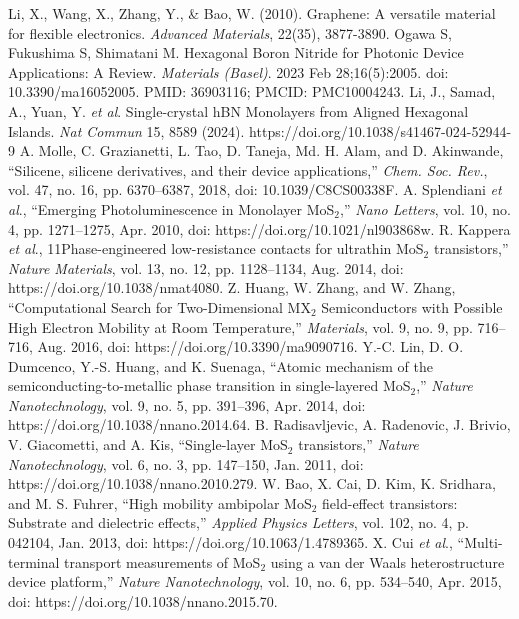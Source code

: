 \documentclass[conference]{IEEEtran}
\begin{document}
\begin{thebibliography}{00}
   Li, X., Wang, X., Zhang, Y., \& Bao, W. (2010). Graphene: A versatile material for flexible electronics. \textit{Advanced Materials}, 22(35), 3877-3890.
   Ogawa S, Fukushima S, Shimatani M. Hexagonal Boron Nitride for Photonic Device Applications: A Review. \textit{Materials (Basel)}. 2023 Feb 28;16(5):2005. doi: 10.3390/ma16052005. PMID: 36903116; PMCID: PMC10004243. 
   Li, J., Samad, A., Yuan, Y. \textit{et al}. Single-crystal hBN Monolayers from Aligned Hexagonal Islands. \textit{Nat Commun} 15, 8589 (2024). https://doi.org/10.1038/s41467-024-52944-9
   A. Molle, C. Grazianetti, L. Tao, D. Taneja, Md. H. Alam, and D. Akinwande, ``Silicene, silicene derivatives, and their device applications,'' \textit{Chem. Soc. Rev.}, vol. 47, no. 16, pp. 6370–6387, 2018, doi: 10.1039/C8CS00338F.
 A. Splendiani \textit{et al}., ``Emerging Photoluminescence in Monolayer MoS$_2$,'' \textit{Nano Letters}, vol. 10, no. 4, pp. 1271–1275, Apr. 2010, doi: https://doi.org/10.1021/nl903868w.
 R. Kappera \textit{et al}., 11Phase-engineered low-resistance contacts for ultrathin MoS$_2$ transistors,'' \textit{Nature Materials}, vol. 13, no. 12, pp. 1128–1134, Aug. 2014, doi: https://doi.org/10.1038/nmat4080.
 Z. Huang, W. Zhang, and W. Zhang, ``Computational Search for Two-Dimensional MX$_2$ Semiconductors with Possible High Electron Mobility at Room Temperature,'' \textit{Materials}, vol. 9, no. 9, pp. 716–716, Aug. 2016, doi: https://doi.org/10.3390/ma9090716.
 Y.-C. Lin, D. O. Dumcenco, Y.-S. Huang, and K. Suenaga, ``Atomic mechanism of the semiconducting-to-metallic phase transition in single-layered MoS$_2$,'' \textit{Nature Nanotechnology}, vol. 9, no. 5, pp. 391–396, Apr. 2014, doi: https://doi.org/10.1038/nnano.2014.64.
 B. Radisavljevic, A. Radenovic, J. Brivio, V. Giacometti, and A. Kis, ``Single-layer MoS$_2$ transistors,'' \textit{Nature Nanotechnology}, vol. 6, no. 3, pp. 147–150, Jan. 2011, doi: https://doi.org/10.1038/nnano.2010.279.
 W. Bao, X. Cai, D. Kim, K. Sridhara, and M. S. Fuhrer, ``High mobility ambipolar MoS$_2$ field-effect transistors: Substrate and dielectric effects,'' \textit{Applied Physics Letters}, vol. 102, no. 4, p. 042104, Jan. 2013, doi: https://doi.org/10.1063/1.4789365.
 X. Cui \textit{et al}., ``Multi-terminal transport measurements of MoS$_2$ using a van der Waals heterostructure device platform,'' \textit{Nature Nanotechnology}, vol. 10, no. 6, pp. 534–540, Apr. 2015, doi: https://doi.org/10.1038/nnano.2015.70.

\end{thebibliography}
\end{document}
